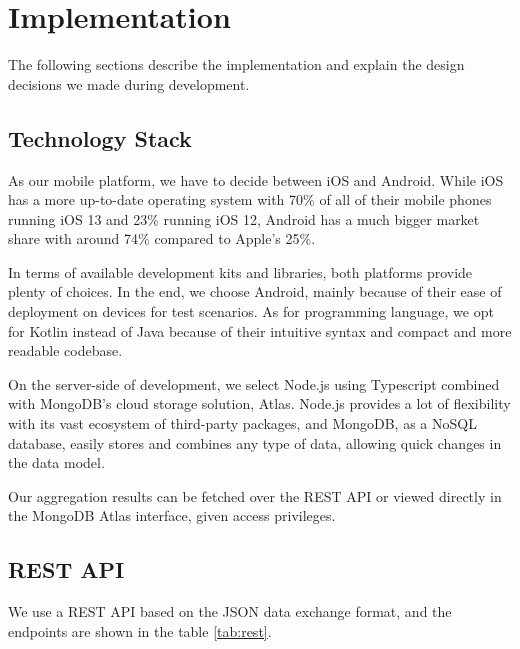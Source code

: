 
\chapter{Implementation}\label{chapter:implementation}

The following sections describe the implementation and explain the design decisions we made during development. 

\section{Technology Stack}

As our mobile platform, we have to decide between iOS and Android. While iOS has a more up-to-date operating system with 70\% of all of their mobile phones running iOS 13 and 23\% running iOS 12, Android has a much bigger market share with around 74\% compared to Apple's 25\%. 

In terms of available development kits and libraries, both platforms provide plenty of choices. In the end, we choose Android, mainly because of their ease of deployment on devices for test scenarios. As for programming language, we opt for Kotlin instead of Java because of their intuitive syntax and compact and more readable codebase.

On the server-side of development, we select Node.js using Typescript combined with MongoDB's cloud storage solution, Atlas. Node.js provides a lot of flexibility with its vast ecosystem of third-party packages, and MongoDB, as a NoSQL database, easily stores and combines any type of data, allowing quick changes in the data model.

Our aggregation results can be fetched over the REST API or viewed directly in the MongoDB Atlas interface, given access privileges.

\section{REST API}
\label{sec:hello}
We use a REST API based on the JSON data exchange format, and the endpoints are shown in the table \ref{tab:rest}.

